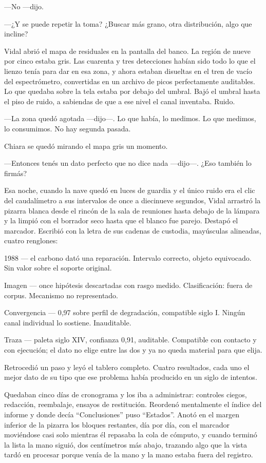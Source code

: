 ---No ---dijo.

---¿Y se puede repetir la toma? ¿Buscar más grano, otra distribución, algo que incline?

Vidal abrió el mapa de residuales en la pantalla del banco. La región de nueve por cinco estaba gris. Las cuarenta y tres detecciones habían sido todo lo que el lienzo tenía para dar en esa zona, y ahora estaban disueltas en el tren de vacío del espectrómetro, convertidas en un archivo de picos perfectamente auditables. Lo que quedaba sobre la tela estaba por debajo del umbral. Bajó el umbral hasta el piso de ruido, a sabiendas de que a ese nivel el canal inventaba. Ruido.

---La zona quedó agotada ---dijo---. Lo que había, lo medimos. Lo que medimos, lo consumimos. No hay segunda pasada.

Chiara se quedó mirando el mapa gris un momento.

---Entonces tenés un dato perfecto que no dice nada ---dijo---. ¿Eso también lo firmás?


\scenebreak


Esa noche, cuando la nave quedó en luces de guardia y el único ruido era el clic del caudalímetro a sus intervalos de once a diecinueve segundos, Vidal arrastró la pizarra blanca desde el rincón de la sala de reuniones hasta debajo de la lámpara y la limpió con el borrador seco hasta que el blanco fue parejo. Destapó el marcador. Escribió con la letra de sus cadenas de custodia, mayúsculas alineadas, cuatro renglones:

1988 --- el carbono dató una reparación. Intervalo correcto, objeto equivocado. Sin valor sobre el soporte original.

Imagen --- once hipótesis descartadas con rasgo medido. Clasificación: fuera de corpus. Mecanismo no representado.

Convergencia --- 0,97 sobre perfil de degradación, compatible siglo I. Ningún canal individual lo sostiene. Inauditable.

Traza --- paleta siglo XIV, confianza 0,91, auditable. Compatible con contacto y con ejecución; el dato no elige entre las dos y ya no queda material para que elija.

Retrocedió un paso y leyó el tablero completo. Cuatro resultados, cada uno el mejor dato de su tipo que ese problema había producido en un siglo de intentos.

Quedaban cinco días de cronograma y los iba a administrar: controles ciegos, redacción, reembalaje, ensayos de restitución. Reordenó mentalmente el índice del informe y donde decía ``Conclusiones'' puso ``Estados''. Anotó en el margen inferior de la pizarra los bloques restantes, día por día, con el marcador moviéndose casi solo mientras él repasaba la cola de cómputo, y cuando terminó la lista la mano siguió, dos centímetros más abajo, trazando algo que la vista tardó en procesar porque venía de la mano y la mano estaba fuera del registro.

